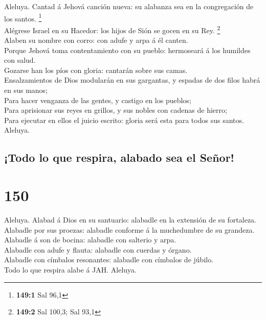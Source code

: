  Aleluya. Cantad á Jehová canción nueva: su alabanza sea
en la congregación de los santos. \footnote{\textbf{149:1} Sal 96,1}\\
 Alégrese Israel en su Hacedor: los hijos de Sión se gocen
en su Rey. \footnote{\textbf{149:2} Sal 100,3; Sal 93,1}\\
 Alaben su nombre con corro: con adufe y arpa á él
canten.\\
 Porque Jehová toma contentamiento con su pueblo:
hermoseará á los humildes con salud.\\
 Gozarse han los píos con gloria: cantarán sobre sus
camas.\\
 Ensalzamientos de Dios modularán en sus gargantas, y
espadas de dos filos habrá en sus manos;\\
 Para hacer venganza de las gentes, y castigo en los
pueblos;\\
 Para aprisionar sus reyes en grillos, y sus nobles con
cadenas de hierro;\\
 Para ejecutar en ellos el juicio escrito: gloria será
esta para todos sus santos. Aleluya.

\hypertarget{todo-lo-que-respira-alabado-sea-el-seuxf1or}{%
\subsection{¡Todo lo que respira, alabado sea el
Señor!}\label{todo-lo-que-respira-alabado-sea-el-seuxf1or}}

\hypertarget{section-149}{%
\section{150}\label{section-149}}

 Aleluya. Alabad á Dios en su santuario: alabadle en la
extensión de su fortaleza.\\
 Alabadle por sus proezas: alabadle conforme á la
muchedumbre de su grandeza.\\
 Alabadle á son de bocina: alabadle con salterio y arpa.\\
 Alabadle con adufe y flauta: alabadle con cuerdas y
órgano.\\
 Alabadle con címbalos resonantes: alabadle con címbalos
de júbilo.\\
 Todo lo que respira alabe á JAH. Aleluya.
